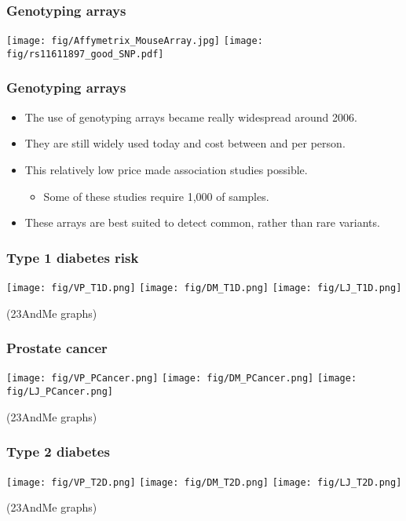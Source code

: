 \documentclass{beamer}
\begin{document}
\begin{frame}
  \frametitle{Genotyping arrays}
  \begin{center}
    \texttt{[image: fig/Affymetrix\_MouseArray.jpg]}
    \texttt{[image: fig/rs11611897\_good\_SNP.pdf]}
  \end{center}
\end{frame}


\begin{frame}
  \frametitle{Genotyping arrays}
  \begin{itemize}
  \item The use of genotyping arrays became really widespread around 2006.
  \item They are still widely used today and cost between  and  per person.
  \item This relatively low price made association studies possible.
    \begin{itemize}
    \item Some of these studies require 1,000 of samples.
    \end{itemize}
  \item These arrays are best suited to detect common, rather than rare variants.
  \end{itemize}
\end{frame}


\begin{frame}
  \frametitle{Type 1 diabetes risk}
  \begin{center}
    \texttt{[image: fig/VP\_T1D.png]}
    \texttt{[image: fig/DM\_T1D.png]}
    \texttt{[image: fig/LJ\_T1D.png]}
  \end{center}
  (23AndMe graphs)
\end{frame}



\begin{frame}
  \frametitle{Prostate cancer}
  \begin{center}
    \texttt{[image: fig/VP\_PCancer.png]}
    \texttt{[image: fig/DM\_PCancer.png]}
    \texttt{[image: fig/LJ\_PCancer.png]}
  \end{center}
  (23AndMe graphs)
\end{frame}



\begin{frame}
  \frametitle{Type 2 diabetes}
  \begin{center}
    \texttt{[image: fig/VP\_T2D.png]}
    \texttt{[image: fig/DM\_T2D.png]}
    \texttt{[image: fig/LJ\_T2D.png]}
  \end{center}
  (23AndMe graphs)
\end{frame}
\end{document}
